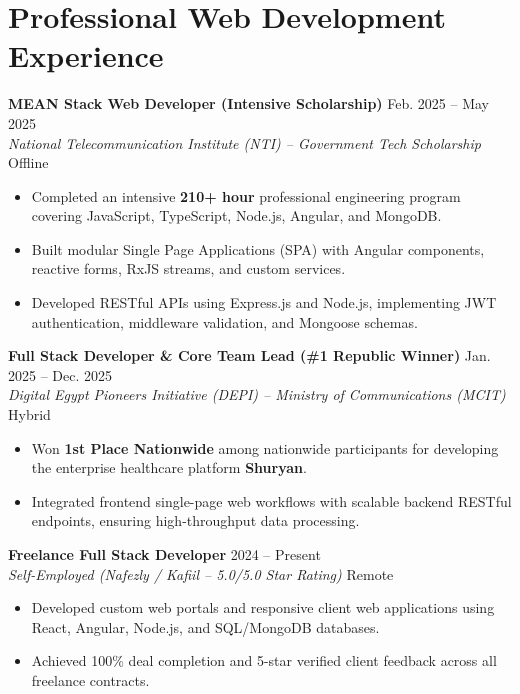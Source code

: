 \documentclass[11pt,a4paper]{article}
\begin{document}
\section{Professional Web Development Experience}

\textbf{MEAN Stack Web Developer (Intensive Scholarship)} \hfill Feb. 2025 -- May 2025 \\
\textit{National Telecommunication Institute (NTI) -- Government Tech Scholarship} \hfill Offline
\begin{itemize}[leftmargin=*, nosep]
    \item Completed an intensive \textbf{210+ hour} professional engineering program covering JavaScript, TypeScript, Node.js, Angular, and MongoDB.
    \item Built modular Single Page Applications (SPA) with Angular components, reactive forms, RxJS streams, and custom services.
    \item Developed RESTful APIs using Express.js and Node.js, implementing JWT authentication, middleware validation, and Mongoose schemas.
\end{itemize}

\textbf{Full Stack Developer \& Core Team Lead (\#1 Republic Winner)} \hfill Jan. 2025 -- Dec. 2025 \\
\textit{Digital Egypt Pioneers Initiative (DEPI) -- Ministry of Communications (MCIT)} \hfill Hybrid
\begin{itemize}[leftmargin=*, nosep]
    \item Won \textbf{1st Place Nationwide} among nationwide participants for developing the enterprise healthcare platform \textbf{Shuryan}.
    \item Integrated frontend single-page web workflows with scalable backend RESTful endpoints, ensuring high-throughput data processing.
\end{itemize}

\textbf{Freelance Full Stack Developer} \hfill 2024 -- Present \\
\textit{Self-Employed (Nafezly / Kafiil -- 5.0/5.0 Star Rating)} \hfill Remote
\begin{itemize}[leftmargin=*, nosep]
    \item Developed custom web portals and responsive client web applications using React, Angular, Node.js, and SQL/MongoDB databases.
    \item Achieved 100\% deal completion and 5-star verified client feedback across all freelance contracts.
\end{itemize}
\end{document}
